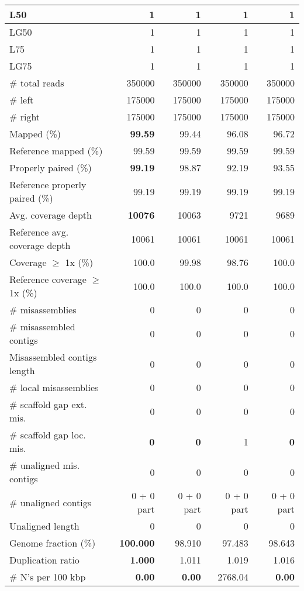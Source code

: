 \documentclass[12pt,a4paper]{article}
\begin{document}
\begin{table}[ht]
\begin{center}
\begin{tabular}{|l*{4}{|r}|}
L50 & 1 & 1 & 1 & 1 \\ \hline
LG50 & 1 & 1 & 1 & 1 \\ \hline
L75 & 1 & 1 & 1 & 1 \\ \hline
LG75 & 1 & 1 & 1 & 1 \\ \hline
\# total reads & 350000 & 350000 & 350000 & 350000 \\ \hline
\# left & 175000 & 175000 & 175000 & 175000 \\ \hline
\# right & 175000 & 175000 & 175000 & 175000 \\ \hline
Mapped (\%) & {\bf 99.59} & 99.44 & 96.08 & 96.72 \\ \hline
Reference mapped (\%) & 99.59 & 99.59 & 99.59 & 99.59 \\ \hline
Properly paired (\%) & {\bf 99.19} & 98.87 & 92.19 & 93.55 \\ \hline
Reference properly paired (\%) & 99.19 & 99.19 & 99.19 & 99.19 \\ \hline
Avg. coverage depth & {\bf 10076} & 10063 & 9721 & 9689 \\ \hline
Reference avg. coverage depth & 10061 & 10061 & 10061 & 10061 \\ \hline
Coverage $\geq$ 1x (\%) & 100.0 & 99.98 & 98.76 & 100.0 \\ \hline
Reference coverage $\geq$ 1x (\%) & 100.0 & 100.0 & 100.0 & 100.0 \\ \hline
\# misassemblies & 0 & 0 & 0 & 0 \\ \hline
\# misassembled contigs & 0 & 0 & 0 & 0 \\ \hline
Misassembled contigs length & 0 & 0 & 0 & 0 \\ \hline
\# local misassemblies & 0 & 0 & 0 & 0 \\ \hline
\# scaffold gap ext. mis. & 0 & 0 & 0 & 0 \\ \hline
\# scaffold gap loc. mis. & {\bf 0} & {\bf 0} & 1 & {\bf 0} \\ \hline
\# unaligned mis. contigs & 0 & 0 & 0 & 0 \\ \hline
\# unaligned contigs & 0 + 0 part & 0 + 0 part & 0 + 0 part & 0 + 0 part \\ \hline
Unaligned length & 0 & 0 & 0 & 0 \\ \hline
Genome fraction (\%) & {\bf 100.000} & 98.910 & 97.483 & 98.643 \\ \hline
Duplication ratio & {\bf 1.000} & 1.011 & 1.019 & 1.016 \\ \hline
\# N's per 100 kbp & {\bf 0.00} & {\bf 0.00} & 2768.04 & {\bf 0.00} \\ \hline

\end{tabular}
\end{center}
\end{table}
\end{document}
